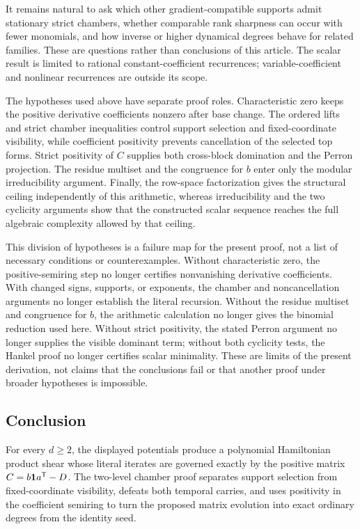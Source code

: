 \documentclass[11pt,letterpaper]{article}
\theoremstyle{plain}
\begin{document}
It remains natural to ask which other gradient-compatible supports admit stationary strict chambers, whether comparable rank sharpness can occur with fewer monomials, and how inverse or higher dynamical degrees behave for related families.  These are questions rather than conclusions of this article.  The scalar result is limited to rational constant-coefficient recurrences; variable-coefficient and nonlinear recurrences are outside its scope.

The hypotheses used above have separate proof roles.  Characteristic zero keeps the positive derivative coefficients nonzero after base change.  The ordered lifts and strict chamber inequalities control support selection and fixed-coordinate visibility, while coefficient positivity prevents cancellation of the selected top forms.  Strict positivity of $C$ supplies both cross-block domination and the Perron projection.  The residue multiset and the congruence for $b$ enter only the modular irreducibility argument.  Finally, the row-space factorization gives the structural ceiling independently of this arithmetic, whereas irreducibility and the two cyclicity arguments show that the constructed scalar sequence reaches the full algebraic complexity allowed by that ceiling.

This division of hypotheses is a failure map for the present proof, not a list of necessary conditions or counterexamples.  Without characteristic zero, the positive-semiring step no longer certifies nonvanishing derivative coefficients.  With changed signs, supports, or exponents, the chamber and noncancellation arguments no longer establish the literal recursion.  Without the residue multiset and congruence for $b$, the arithmetic calculation no longer gives the binomial reduction used here.  Without strict positivity, the stated Perron argument no longer supplies the visible dominant term; without both cyclicity tests, the Hankel proof no longer certifies scalar minimality.  These are limits of the present derivation, not claims that the conclusions fail or that another proof under broader hypotheses is impossible.

\subsection{Conclusion}

For every $d\geq2$, the displayed potentials produce a polynomial Hamiltonian product shear whose literal iterates are governed exactly by the positive matrix $C=b\mathbf{1} a^{\mathsf{T}}-D$.  The two-level chamber proof separates support selection from fixed-coordinate visibility, defeats both temporal carries, and uses positivity in the coefficient semiring to turn the proposed matrix evolution into exact ordinary degrees from the identity seed.
\end{document}

